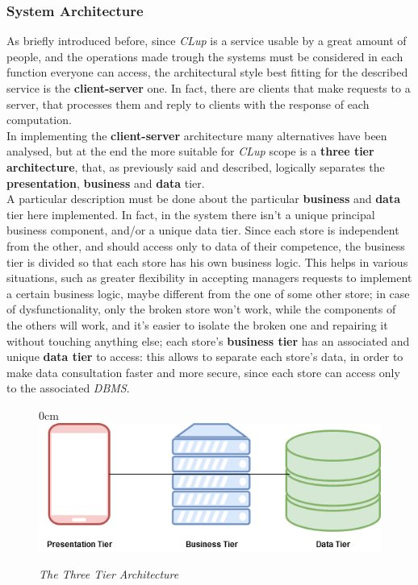 \documentclass{article}
\begin{document}
	\subsubsection{System Architecture}
	As briefly introduced before, since \emph{CLup} is a service usable by a great amount of people, and the operations made trough the systems must be considered in each function everyone can access, the architectural style best fitting for the described service is the {\bfseries client-server} one. In fact, there are clients that make requests to a server, that processes them and reply to clients with the response of each computation.\\
	In implementing the {\bfseries client-server} architecture many alternatives have been analysed, but at the end the more suitable for \emph{CLup} scope is a {\bfseries three tier architecture}, that, as previously said and described, logically separates the {\bfseries presentation}, {\bfseries business} and {\bfseries data} tier.\\
	A particular description must be done about the particular {\bfseries business} and {\bfseries data} tier here implemented. In fact, in the system there isn't a unique principal business component, and/or a unique data tier. Since each store is independent from the other, and should access only to data of their competence, the business tier is divided so that each store has his own business logic. This helps in various situations, such as greater flexibility in accepting managers requests to implement a certain business logic, maybe different from the one of some other store; in case of dysfunctionality, only the broken store won't work, while the components of the others will work, and it's easier to isolate the broken one and repairing it without touching anything else; each store's {\bfseries business tier} has an associated and unique {\bfseries data tier} to access: this allows to separate each store's data, in order to make data consultation faster and more secure, since each store can access only to the associated \emph{DBMS}.\\
	\begin{figure}
		\begin{adjustwidth} {0cm}{}
			\centering
			\includegraphics[scale=0.5]{ThreeTier.png}
		\end{adjustwidth}
		\caption{\emph{The Three Tier Architecture}}
	\end{figure}
\end{document}
